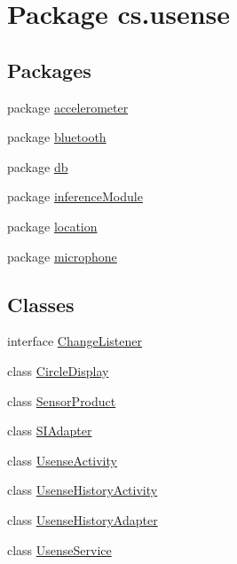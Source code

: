 \hypertarget{namespacecs_1_1usense}{}\section{Package cs.\+usense}
\label{namespacecs_1_1usense}
\subsection*{Packages}
\begin{DoxyCompactItemize}
\item 
package \hyperlink{namespacecs_1_1usense_1_1accelerometer}{accelerometer}
\item 
package \hyperlink{namespacecs_1_1usense_1_1bluetooth}{bluetooth}
\item 
package \hyperlink{namespacecs_1_1usense_1_1db}{db}
\item 
package \hyperlink{namespacecs_1_1usense_1_1inference_module}{inference\+Module}
\item 
package \hyperlink{namespacecs_1_1usense_1_1location}{location}
\item 
package \hyperlink{namespacecs_1_1usense_1_1microphone}{microphone}
\end{DoxyCompactItemize}
\subsection*{Classes}
\begin{DoxyCompactItemize}
\item 
interface \hyperlink{interfacecs_1_1usense_1_1_change_listener}{Change\+Listener}
\item 
class \hyperlink{classcs_1_1usense_1_1_circle_display}{Circle\+Display}
\item 
class \hyperlink{classcs_1_1usense_1_1_sensor_product}{Sensor\+Product}
\item 
class \hyperlink{classcs_1_1usense_1_1_s_i_adapter}{S\+I\+Adapter}
\item 
class \hyperlink{classcs_1_1usense_1_1_usense_activity}{Usense\+Activity}
\item 
class \hyperlink{classcs_1_1usense_1_1_usense_history_activity}{Usense\+History\+Activity}
\item 
class \hyperlink{classcs_1_1usense_1_1_usense_history_adapter}{Usense\+History\+Adapter}
\item 
class \hyperlink{classcs_1_1usense_1_1_usense_service}{Usense\+Service}
\end{DoxyCompactItemize}


